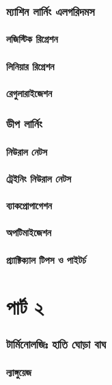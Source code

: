 \documentclass{article}[book]
\begin{document}
\section{ম্যাশিন লার্নিং এলগরিদমস}

\subsection{লজিস্টিক রিগ্রেশন}
\subsection{লিনিয়ার রিগ্রেশন}
\subsection{রেগুলারাইজেশন}

\section{ডীপ লার্নিং}
\subsection{নিউরাল নেটস}
\subsection{ট্রেইনিং নিউরাল নেটস}
\subsection{ব্যাকপ্রোপাগেশন}
\subsection{অপটিমাইজেশন}
\subsection{প্র্যাক্টিক্যাল টিপস ও পাইটর্চ}


 \part{পার্ট ২} 
 
\section{টার্মিনোলজিঃ  হাতি ঘোড়া বাঘ}
\subsection{ল্যাঙ্গুয়েজ}
\end{document}
